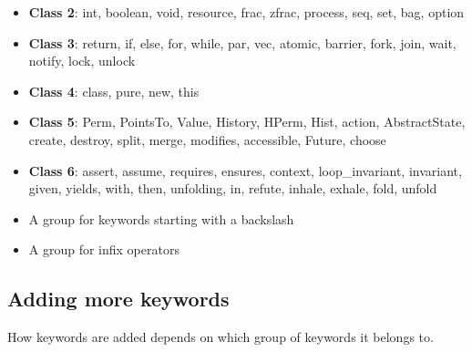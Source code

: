 \documentclass[a4paper]{scrartcl}
\begin{document}
	\begin{itemize}
		\setlength\itemsep{0cm}
		\item \textbf{Class 2}:	int, boolean, void, resource, frac, zfrac, process, seq, set, bag, option
		\item \textbf{Class 3}: return, if, else, for, while, par, vec, atomic, barrier, fork, join, wait, notify, lock, unlock
		\item \textbf{Class 4}: class, pure, new, this
		\item \textbf{Class 5}: Perm, PointsTo, Value, History, HPerm, Hist, action, AbstractState, create, destroy, split, merge, modifies, accessible, Future, choose
		\item \textbf{Class 6}: assert, assume, requires, ensures, context, loop\_invariant, invariant, given, yields, with, then, unfolding, in, refute, inhale, exhale, fold, unfold
		\item A group for keywords starting with a backslash
		\item A group for infix operators
	\end{itemize}

\subsection{Adding more keywords}
How keywords are added depends on which group of keywords it belongs to.
\end{document}
